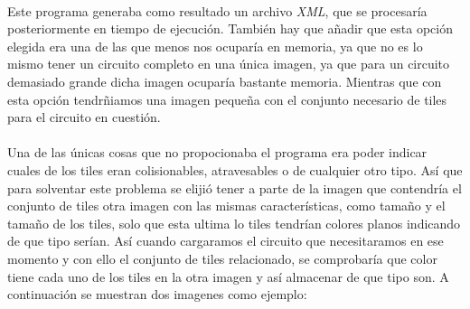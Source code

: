 \paragraph{}
Este programa generaba como resultado un archivo \emph{XML}, que se procesaría posteriormente en tiempo de ejecución. También hay
que añadir que esta opción elegida era una de las que menos nos ocuparía en memoria, ya que no es lo mismo tener un circuito 
completo en una única imagen, ya que para un circuito demasiado grande dicha imagen ocuparía bastante memoria. Mientras
que con esta opción tendrñiamos una imagen pequeña con el conjunto necesario de tiles para el circuito en cuestión.

\paragraph{}
Una de las únicas cosas que no propocionaba el programa era poder indicar cuales de los tiles eran colisionables, atravesables o
de cualquier otro tipo. Así que para solventar este problema se elijió tener a parte de la imagen que contendría el conjunto de 
tiles otra imagen con las mismas características, como tamaño y el tamaño de los tiles, solo que esta ultima lo tiles tendrían 
colores planos indicando de que tipo serían. Así cuando cargaramos el circuito que necesitaramos en ese momento y con ello
el conjunto de tiles relacionado, se comprobaría que color tiene cada uno de los tiles en la otra imagen y así almacenar
de que tipo son. A continuación se muestran dos imagenes como ejemplo:


